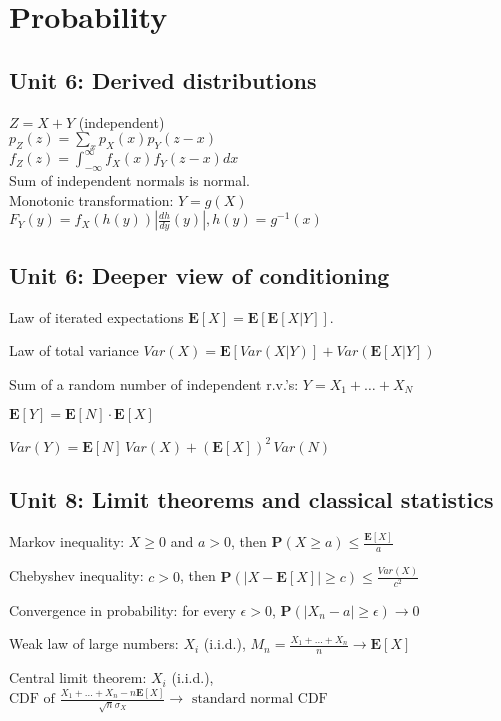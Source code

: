 \section{Probability} 

\subsection*{Unit 6: Derived distributions}
$Z = X+Y$ (independent)\\
$p_Z(z) = \sum_x p_X(x) p_Y(z-x)$\\
$f_Z(z) = \int_{-\infty}^{\infty} f_X(x) f_Y(z-x) dx$\\
Sum of independent normals is normal.\\

Monotonic transformation: $Y = g(X)$\\
$F_Y(y) = f_X(h(y))\left|\frac{dh}{dy}(y)\right|, h(y) = g^{-1}(x)$

\subsection*{Unit 6: Deeper view of conditioning}

Law of iterated expectations $\mathbf{E}[X] = \mathbf{E}\left[\mathbf{E}[X|Y] \right]$.

Law of total variance $Var(X) = \mathbf{E}\left[Var(X|Y)\right] + Var(\mathbf{E}[X|Y])$

Sum of a random number of independent r.v.'s: $Y = X_1 + \ldots + X_N$

$\mathbf{E}[Y] = \mathbf{E}[N] \cdot \mathbf{E}[X]$

$Var(Y) = \mathbf{E}[N]\,Var(X) + (\mathbf{E}[X])^2\,Var(N)$


\subsection*{Unit 8: Limit theorems and classical statistics}

Markov inequality: $X \geq 0$ and $a > 0$, then $\mathbf{P}(X \geq a) \leq \frac{\mathbf{E}[X]}{a}$

Chebyshev inequality: $c > 0$, then $\mathbf{P}(|X - \mathbf{E}[X]| \geq c) \leq \frac{Var(X)}{c^2}$

Convergence in probability: for every $\epsilon > 0$, $\mathbf{P}(|X_n - a| \geq \epsilon) \rightarrow 0$

Weak law of large numbers: $X_i$ (i.i.d.), $M_n = \frac{X_1 + \ldots + X_n}{n} \rightarrow \mathbf{E}[X]$

Central limit theorem: $X_i$ (i.i.d.), $\text{CDF of }\frac{X_1 + \ldots + X_n - n\mathbf{E}[X]}{\sqrt{n}\sigma_X} \rightarrow \text{ standard normal CDF}$


